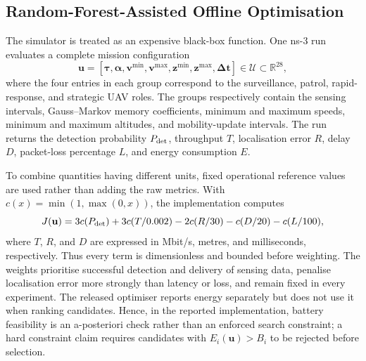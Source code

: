 
\subsection{Random-Forest-Assisted Offline Optimisation}
\label{sec:rf-optimisation}

The simulator is treated as an expensive black-box function. One ns-3 run
evaluates a complete mission configuration
\begin{equation}
 \mathbf{u}=[\boldsymbol{\tau},\boldsymbol{\alpha},
 \mathbf{v}^{\min},\mathbf{v}^{\max},
 \mathbf{z}^{\min},\mathbf{z}^{\max},\boldsymbol{\Delta t}]
 \in\mathcal{U}\subset\mathbb{R}^{28},
 \label{eq:decision-vector}
\end{equation}
where the four entries in each group correspond to the surveillance, patrol,
rapid-response, and strategic UAV roles. The groups respectively contain the
sensing intervals, Gauss--Markov memory coefficients, minimum and maximum
speeds, minimum and maximum altitudes, and mobility-update intervals. The run
returns the detection probability $P_{\rm det}$, throughput $T$, localisation
error $R$, delay $D$, packet-loss percentage $L$, and energy consumption $E$.

To combine quantities having different units, fixed operational reference
values are used rather than adding the raw metrics. With
$c(x)=\min(1,\max(0,x))$, the implementation computes
\begin{equation}
 J(\mathbf{u})=3c(P_{\rm det})+3c(T/0.002)
 -2c(R/30)-c(D/20)-c(L/100),
 \label{eq:implemented-objective}
\end{equation}
where $T$, $R$, and $D$ are expressed in Mbit/s, metres, and milliseconds,
respectively. Thus every term is dimensionless and bounded before weighting.
The weights prioritise successful detection and delivery of sensing data,
penalise localisation error more strongly than latency or loss, and remain
fixed in every experiment. The released optimiser reports energy separately
but does not use it when ranking candidates. Hence, in the reported
implementation, battery feasibility is an a-posteriori check rather than an
enforced search constraint; a hard constraint claim requires candidates with
$E_i(\mathbf{u})>B_i$ to be rejected before selection.

